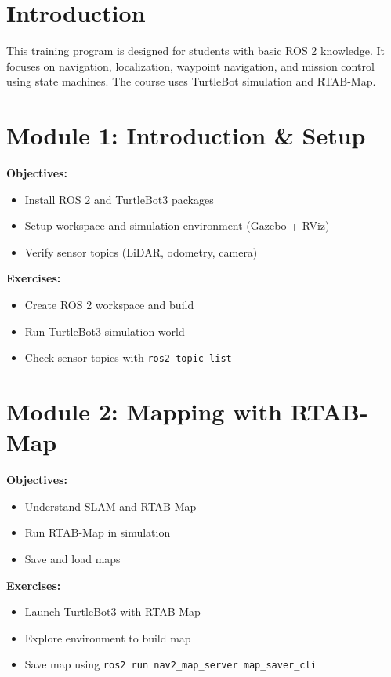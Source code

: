 \documentclass{article}
\begin{document}


\section*{Introduction}
This training program is designed for students with basic ROS 2 knowledge. It focuses on navigation, localization, waypoint navigation, and mission control using state machines. The course uses TurtleBot simulation and RTAB-Map.

\section{Module 1: Introduction \& Setup}
\textbf{Objectives:}
\begin{itemize}
  \item Install ROS 2 and TurtleBot3 packages
  \item Setup workspace and simulation environment (Gazebo + RViz)
  \item Verify sensor topics (LiDAR, odometry, camera)
\end{itemize}
\textbf{Exercises:}
\begin{itemize}
  \item Create ROS 2 workspace and build
  \item Run TurtleBot3 simulation world
  \item Check sensor topics with \texttt{ros2 topic list}
\end{itemize}

\section{Module 2: Mapping with RTAB-Map}
\textbf{Objectives:}
\begin{itemize}
  \item Understand SLAM and RTAB-Map
  \item Run RTAB-Map in simulation
  \item Save and load maps
\end{itemize}
\textbf{Exercises:}
\begin{itemize}
  \item Launch TurtleBot3 with RTAB-Map
  \item Explore environment to build map
  \item Save map using \texttt{ros2 run nav2\_map\_server map\_saver\_cli}
\end{itemize}
\end{document}
